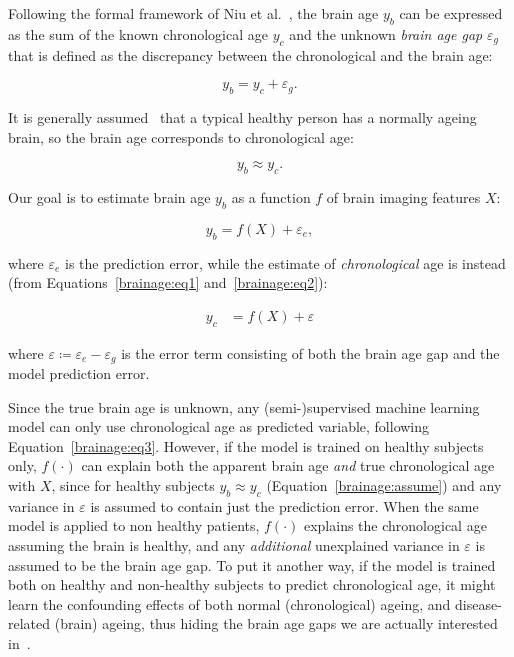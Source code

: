 Following the formal framework of Niu et al.~\cite{niu2019improved}, the brain age $y_b$ can be expressed as the sum of the known chronological age $y_c$ and the unknown \textit{brain age gap} $\varepsilon_g$ that is defined as the discrepancy between the chronological and the brain age:

\begin{equation}
    \label{brainage:eq1}
    y_b = y_c + \varepsilon_g.
\end{equation}

It is generally assumed~\cite{franke2019ten} that a typical healthy person has a normally ageing brain, so the brain age corresponds to chronological age:

\begin{equation}
    \label{brainage:assume}
    y_b \approx y_c.
\end{equation}

Our goal is to estimate brain age $y_b$ as a function $f$ of brain imaging features $X$:

\begin{equation}
    \label{brainage:eq2}
    y_b = f(X) + \varepsilon_e,
\end{equation}

where $\varepsilon_e$ is the prediction error, while the estimate of \textit{chronological} age is instead (from Equations~\eqref{brainage:eq1} and~\eqref{brainage:eq2}):

\begin{align}
    y_c &= f(X) + \varepsilon
        \label{brainage:eq3}
\end{align}

where $\varepsilon \coloneqq \varepsilon_e - \varepsilon_g$ is the error term consisting of both the brain age gap and the model prediction error.

Since the true brain age is unknown, any (semi-)supervised machine learning model can only use chronological age as predicted variable, following Equation~\eqref{brainage:eq3}. However, if the model is trained on healthy subjects only, $f(\cdot)$ can explain both the apparent brain age \textit{and} true chronological age with $X$, since for healthy subjects $y_b \approx y_c$ (Equation~\eqref{brainage:assume}) and any variance in $\varepsilon$ is assumed to contain just the prediction error. When the same model is applied to non healthy patients, $f(\cdot)$ explains the chronological age assuming the brain is healthy, and any \textit{additional} unexplained variance in $\varepsilon$ is assumed to be the brain age gap. To put it another way, if the model is trained both on healthy and non-healthy subjects to predict chronological age, it might learn the confounding effects of both normal (chronological) ageing, and disease-related (brain) ageing, thus hiding the brain age gaps we are actually interested in~\cite{dukart2011age}.

